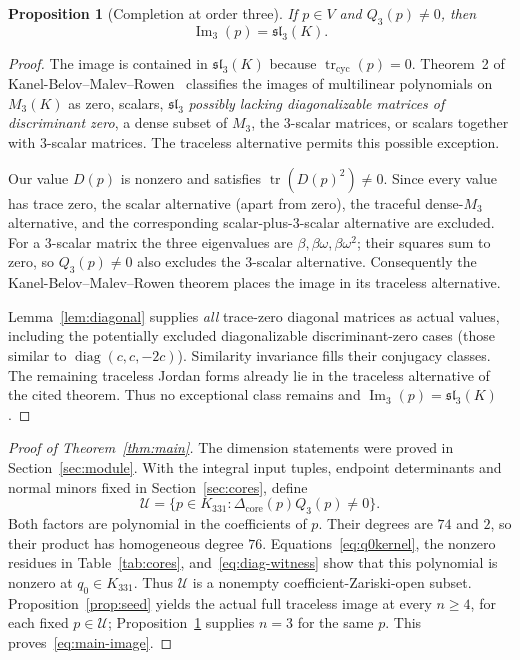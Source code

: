 \documentclass[11pt,reqno]{amsart}
\newtheorem{proposition}[theorem]{Proposition}
\theoremstyle{definition}
\newcommand{\im}{\operatorname{Im}}
\newcommand{\tr}{\operatorname{tr}}
\newcommand{\cyc}{\operatorname{tr}_{\mathrm{cyc}}}
\newcommand{\Ucal}{\mathcal U}
\begin{document}
\begin{proposition}[Completion at order three]\label{prop:three}
If $p\in V$ and $Q_3(p)\ne0$, then
\[
 \im_3(p)=\mathfrak{sl}_3(K).
\]
\end{proposition}
\begin{proof}
The image is contained in $\mathfrak{sl}_3(K)$ because $\cyc(p)=0$.  Theorem~2 of Kanel-Belov--Malev--Rowen~\cite{KBR2016} classifies the images of multilinear polynomials on $M_3(K)$ as zero, scalars, $\mathfrak{sl}_3$ \emph{possibly lacking diagonalizable matrices of discriminant zero}, a dense subset of $M_3$, the $3$-scalar matrices, or scalars together with $3$-scalar matrices.  The traceless alternative permits this possible exception.

Our value $D(p)$ is nonzero and satisfies $\tr(D(p)^2)\ne0$.  Since every value has trace zero, the scalar alternative (apart from zero), the traceful dense-$M_3$ alternative, and the corresponding scalar-plus-$3$-scalar alternative are excluded.  For a $3$-scalar matrix the three eigenvalues are $\beta,\beta\omega,\beta\omega^2$; their squares sum to zero, so $Q_3(p)\ne0$ also excludes the $3$-scalar alternative.  Consequently the Kanel-Belov--Malev--Rowen theorem places the image in its traceless alternative.

Lemma~\ref{lem:diagonal} supplies \emph{all} trace-zero diagonal matrices as actual values, including the potentially excluded diagonalizable discriminant-zero cases (those similar to $\operatorname{diag}(c,c,-2c)$).  Similarity invariance fills their conjugacy classes.  The remaining traceless Jordan forms already lie in the traceless alternative of the cited theorem.  Thus no exceptional class remains and $\im_3(p)=\mathfrak{sl}_3(K)$.
\end{proof}

\begin{proof}[Proof of Theorem~\ref{thm:main}]
The dimension statements were proved in Section~\ref{sec:module}.  With the integral input tuples, endpoint determinants and normal minors fixed in Section~\ref{sec:cores}, define
\begin{equation}\label{eq:U}
 \Ucal=\{p\in K_{331}:\Delta_{\mathrm{core}}(p)Q_3(p)\ne0\}.
\end{equation}
Both factors are polynomial in the coefficients of $p$.  Their degrees are $74$ and $2$, so their product has homogeneous degree $76$.  Equations~\eqref{eq:q0kernel}, the nonzero residues in Table~\ref{tab:cores}, and~\eqref{eq:diag-witness} show that this polynomial is nonzero at $q_0\in K_{331}$.  Thus $\Ucal$ is a nonempty coefficient-Zariski-open subset.  Proposition~\ref{prop:seed} yields the actual full traceless image at every $n\ge4$, for each fixed $p\in\Ucal$; Proposition~\ref{prop:three} supplies $n=3$ for the same $p$.  This proves~\eqref{eq:main-image}.
\end{proof}
\end{document}
